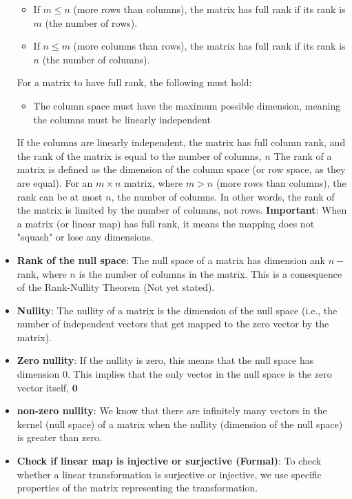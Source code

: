 \documentclass{report}
\begin{document}
\begin{itemize}
\begin{itemize}
            \item If $m\le n$ (more rows than columns), the matrix has full rank if its rank is $m$ (the number of rows).
            \item If $n \le m$ (more columns than rows), the matrix has full rank if its rank is $n$ (the number of columns).
        \end{itemize}
        \bigbreak \noindent 
        For a matrix to have full rank, the following must hold:
        \begin{itemize}
            \item The column space must have the maximum possible dimension, meaning the columns must be linearly independent
        \end{itemize}
        \bigbreak \noindent 
        If the columns are linearly independent, the matrix has full column rank, and the rank of the matrix is equal to the number of columns, $n$
        \bigbreak \noindent 
        The rank of a matrix is defined as the dimension of the column space (or row space, as they are equal).
        \bigbreak \noindent 
        For an $m\times n$ matrix, where $m > n$ (more rows than columns), the rank can be at most $n$, the number of columns. In other words, the rank of the matrix is limited by the number of columns, not rows.
        \bigbreak \noindent 
        \textbf{Important}: When a matrix (or linear map) has full rank, it means the mapping does not "squash" or lose any dimensions.
    \item \textbf{Rank of the null space}: The null space of a matrix has dimension ank $n-$rank, where $n$ is the number of columns in the matrix. This is a consequence of the Rank-Nullity Theorem (Not yet stated).
    \item \textbf{Nullity}: The nullity of a matrix is the dimension of the null space (i.e., the number of independent vectors that get mapped to the zero vector by the matrix).
    \item \textbf{Zero nullity}: If the nullity is zero, this means that the null space has dimension 0. This implies that the only vector in the null space is the zero vector itself, $\mathbf{0}$
    \item \textbf{non-zero nullity}: 
We know that there are infinitely many vectors in the kernel (null space) of a matrix when the nullity (dimension of the null space) is greater than zero.
    \item \textbf{Check if linear map is injective or surjective (Formal)}: To check whether a linear transformation is surjective or injective, we use specific properties of the matrix representing the transformation.

\end{itemize}
\end{document}
